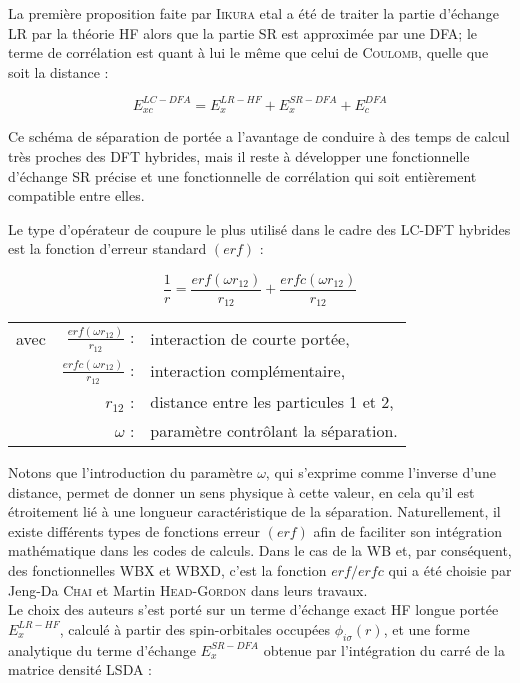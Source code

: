 {{La première proposition faite par \textsc{Iikura} etal\cite{iiakura} a été de traiter la partie d'échange LR par la théorie HF alors que la partie SR est approximée par une DFA; le terme de corrélation est quant à lui le même que celui de \textsc{Coulomb}, quelle que soit la distance :

\begin{equation}
E_{xc}^{LC-DFA} = E_{x}^{LR-HF} + E_{x}^{SR-DFA} + E_{c}^{DFA}
\end{equation}

Ce schéma de séparation de portée a l'avantage de conduire à des temps de calcul très proches des DFT hybrides, mais il reste à développer une fonctionnelle d'échange SR précise et une fonctionnelle de corrélation qui soit entièrement compatible entre elles.

Le type d'opérateur de coupure le plus utilisé dans le cadre des LC-DFT hybrides est la fonction d'erreur standard $(erf)$ :

\begin{equation}
\frac{1}{r} = \frac{erf(\omega r_{12})}{r_{12}} + \frac{erfc(\omega r_{12})}{r_{12}}
\label{erf}
\end{equation}

\begin{flushleft}
\begin{tabular}{@{}lrp{10cm}}
avec & $\frac{erf(\omega r_{12})}{r_{12}}$ : & interaction de courte portée, \\
& $\frac{erfc(\omega r_{12})}{r_{12}}$ : & interaction complémentaire, \\
& $r_{12}$ : & distance entre les particules 1 et 2, \\
& $\omega$ : & paramètre contrôlant la séparation.
\end{tabular}
\end{flushleft}

Notons que l'introduction du paramètre $\omega$, qui s'exprime comme l'inverse d'une distance, permet de donner un sens physique à cette valeur, en cela qu'il est étroitement lié à une longueur caractéristique de la séparation.
Naturellement, il existe différents types de fonctions erreur $(erf)$ afin de faciliter son intégration mathématique dans les codes de calculs. Dans le cas de la WB\cite{WB97X} et, par conséquent, des fonctionnelles WBX et WBXD, c'est la fonction $erf/erfc$ qui a été choisie par Jeng-Da \textsc{Chai} et Martin \textsc{Head-Gordon} dans leurs travaux. \\

Le choix des auteurs s'est porté sur un terme d'échange exact HF longue portée $E_{x}^{LR-HF}$, calculé à partir des spin-orbitales occupées $\phi_{i \sigma}(r)$, et une forme analytique du terme d'échange $E_{x}^{SR-DFA}$ obtenue par l'intégration du carré de la matrice densité LSDA :

}}
